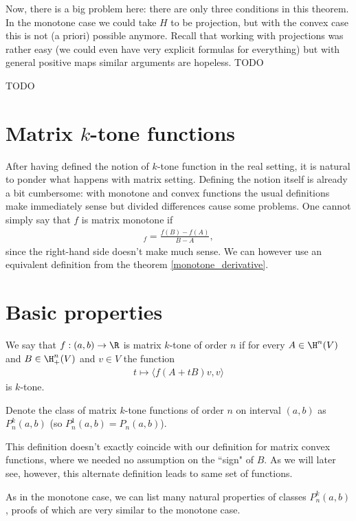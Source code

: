 Now, there is a big problem here: there are only three conditions in this theorem. In the monotone case we could take $H$ to be projection, but with the convex case this is not (a priori) possible anymore. Recall that working with projections was rather easy (we could even have very explicit formulas for everything) but with general positive maps similar arguments are hopeless. TODO

TODO

\section{Matrix $k$-tone functions}

After having defined the notion of $k$-tone function in the real setting, it is natural to ponder what happens with matrix setting. Defining the notion itself is already a bit cumbersome: with monotone and convex functions the usual definitions make immediately sense but divided differences cause some problems. One cannot simply say that $f$ is matrix monotone if
\begin{align*}
	[A, B]_{f} = \frac{f(B) - f(A)}{B - A},
\end{align*}
since the right-hand side doesn't make much sense. We can however use an equivalent definition from the theorem \ref{monotone_derivative}.

\section{Basic properties}

\begin{maar}
	We say that $f : (a, b) \to \R$ is matrix $k$-tone of order $n$ if for every $A \in \H^{n}(V)$ and $B \in \H^{n}_{+}(V)$ and $v \in V$ the function
	\begin{align*}
		t \mapsto \langle f(A + t B) v, v \rangle
	\end{align*}
	is $k$-tone.
\end{maar}

Denote the class of matrix $k$-tone functions of order $n$ on interval $(a, b)$ as $P^{k}_{n}(a, b)$ (so $P^{1}_{n}(a, b) = P_{n}(a, b)$).

This definition doesn't exactly coincide with our definition for matrix convex functions, where we needed no assumption on the ``sign" of $B$. As we will later see, however, this alternate definition leads to same set of functions.


As in the monotone case, we can list many natural properties of classes $P^{k}_{n}(a, b)$, proofs of which are very similar to the monotone case.

